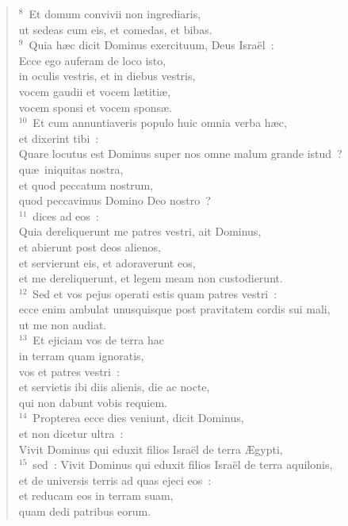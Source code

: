 \begin{flushleft}
\begin{verse}
${}^{8}$~Et domum convivii non ingrediaris,\\ ut sedeas cum eis, et comedas, et bibas.\\
${}^{9}$~Quia h\ae c dicit Dominus exercituum, Deus Isra\"el~:\\ Ecce ego auferam de loco isto,\\ in oculis vestris, et in diebus vestris,\\ vocem gaudii et vocem l\ae titi\ae ,\\ vocem sponsi et vocem spons\ae .\\
${}^{10}$~Et cum annuntiaveris populo huic omnia verba h\ae c,\\ et dixerint tibi~:\\ Quare locutus est Dominus super nos omne malum grande istud~?\\ qu\ae\ iniquitas nostra,\\ et quod peccatum nostrum,\\ quod peccavimus Domino Deo nostro~?\\
${}^{11}$~dices ad eos~:\\ Quia dereliquerunt me patres vestri, ait Dominus,\\ et abierunt post deos alienos,\\ et servierunt eis, et adoraverunt eos,\\ et me dereliquerunt, et legem meam non custodierunt.\\
${}^{12}$~Sed et vos pejus operati estis quam patres vestri~:\\ ecce enim ambulat unusquisque post pravitatem cordis sui mali,\\ ut me non audiat.\\
${}^{13}$~Et ejiciam vos de terra hac\\ in terram quam ignoratis,\\ vos et patres vestri~:\\ et servietis ibi diis alienis, die ac nocte,\\ qui non dabunt vobis requiem.\\
${}^{14}$~Propterea ecce dies veniunt, dicit Dominus,\\ et non dicetur ultra~:\\ Vivit Dominus qui eduxit filios Isra\"el de terra \AE gypti,\\
${}^{15}$~sed~: Vivit Dominus qui eduxit filios Isra\"el de terra aquilonis,\\ et de universis terris ad quas ejeci eos~:\\ et reducam eos in terram suam,\\ quam dedi patribus eorum.\\

\end{verse}
\end{flushleft}
